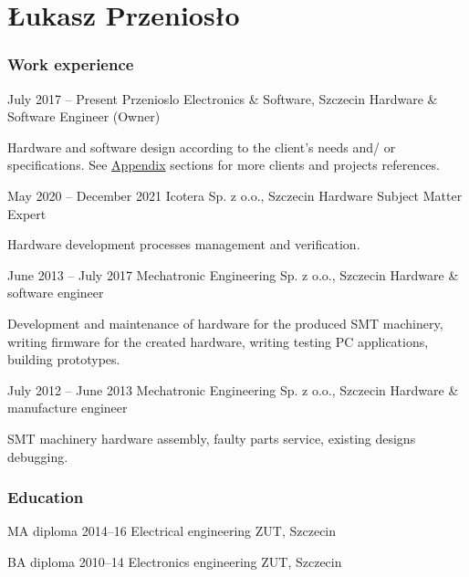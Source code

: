 \documentclass{tccv}
\begin{document}
\part{Łukasz Przeniosło}

\section{Work experience}

\begin{eventlist}

\item{July 2017 -- Present}
     {Przenioslo Electronics \& Software, Szczecin}
     {Hardware \& Software Engineer (Owner)}
     
Hardware and software design according to the client's needs and/ or specifications. See \hyperref[sec:clients]{Appendix} sections for more clients and projects references. 

\item{May 2020 -- December 2021}
     {Icotera Sp. z o.o., Szczecin}
     {Hardware Subject Matter Expert}
     
Hardware development processes management and verification.

\item{June 2013 -- July 2017}
     {Mechatronic Engineering Sp. z o.o., Szczecin}
     {Hardware \& software engineer}
     
Development and maintenance of hardware for the produced SMT machinery, writing firmware for the created hardware, writing testing PC applications, building prototypes. 

\item{July 2012 -- June 2013}
     {Mechatronic Engineering Sp. z o.o., Szczecin}
     {Hardware \& manufacture engineer}

SMT machinery hardware assembly, faulty parts service, existing designs debugging. 

\end{eventlist}

\section{Education}

\begin{yearlist}

\item[MA diploma]{2014--16}
     {Electrical engineering}
     {ZUT, Szczecin}

\item[BA diploma]{2010--14}
     {Electronics engineering}
     {ZUT, Szczecin}

\end{yearlist}
\end{document}
